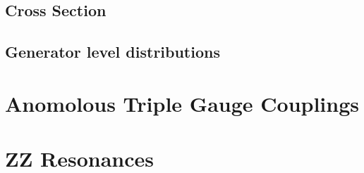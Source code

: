 %
%
\subsection{Cross Section}
\subsection{Generator level distributions}
\section{Anomolous Triple Gauge Couplings}
\section{ZZ Resonances}
